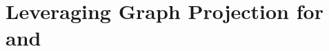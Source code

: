 


\section{Leveraging Graph Projection for \mininconsistency~ and \problematic}\label{sec:graph-algorithms-graphproj}

